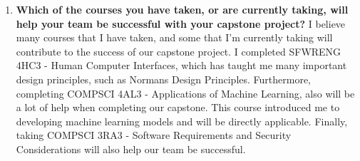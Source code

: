 \begin{enumerate}
 \item \textbf{Which of the courses you have taken, or are currently
      taking, will help your team be successful with your capstone
    project?} \newline
  I believe many courses that I have taken, and some that I’m currently taking will 
  contribute to the success of our capstone project. I completed
  SFWRENG 4HC3 - Human Computer Interfaces, which has taught me many 
  important design principles, such as Normans Design Principles. Furthermore, 
  completing COMPSCI 4AL3 - Applications of Machine Learning, also will be a lot of help when 
  completing our capstone. This course introduced me to developing machine learning models and 
  will be directly applicable. Finally, taking COMPSCI 3RA3 - Software Requirements and Security 
  Considerations will also help our team be successful. 
  
\end{enumerate}


